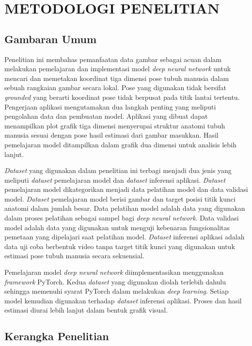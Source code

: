 
\chapter{METODOLOGI PENELITIAN}
\label{cha:3-MetodologiPenelitian}

\section{Gambaran Umum} \label{sec:3-GambaranUmum}

Penelitian ini membahas pemanfaatan data gambar sebagai acuan dalam melakukan pemelajaran dan
implementasi model \textit{deep neural network} untuk mencari dan memetakan koordinat tiga dimensi
pose tubuh manusia dalam sebuah rangkaian gambar secara lokal.
Pose yang digunakan tidak bersifat \textit{grounded} yang berarti koordinat pose tidak berpusat pada
titik lantai tertentu.
Pengerjaan aplikasi mengutamakan dua
langkah penting yang meliputi pengolahan data dan pembuatan model. Aplikasi yang dibuat dapat menampilkan
plot grafik tiga dimensi menyerupai struktur anatomi tubuh manusia sesuai dengan pose hasil
estimasi dari gambar masukkan.
Hasil pemelajaran model ditampilkan dalam grafik dua dimensi untuk analisis lebih lanjut.

\textit{Dataset} yang digunakan dalam penelitian ini terbagi menjadi dua jenis yang meliputi
\textit{dataset} pemelajaran model dan \textit{dataset} inferensi aplikasi.
\textit{Dataset} pemelajaran model dikategorikan menjadi data pelatihan model dan data validasi model.
\textit{Dataset} pemelajaran model berisi gambar dan target posisi titik kunci anatomi dalam jumlah besar.
Data pelatihan model adalah data yang digunakan dalam proses pelatihan sebagai sampel bagi \textit{deep neural network}.
Data validasi model adalah data yang digunakan untuk menguji kebenaran fungsionalitas pemetaan yang
dipelajari saat pelatihan model. \textit{Dataset} inferensi aplikasi adalah data uji coba berbentuk
video tanpa target titik kunci yang digunakan untuk estimasi pose tubuh manusia secara sekuensial.

Pemelajaran model \textit{deep neural network} diimplementasikan menggunakan \textit{framework} PyTorch.
Kedua \textit{dataset} yang digunakan diolah terlebih dahulu sehingga memenuhi syarat PyTorch dalam melakukan
\textit{deep learning}.
Setiap model kemudian digunakan terhadap \textit{dataset} inferensi
aplikasi. Proses dan hasil estimasi diurai lebih lanjut dalam bentuk grafik visual.

\section{Kerangka Penelitian} \label{sec:3-KerangkaPenelitian}

